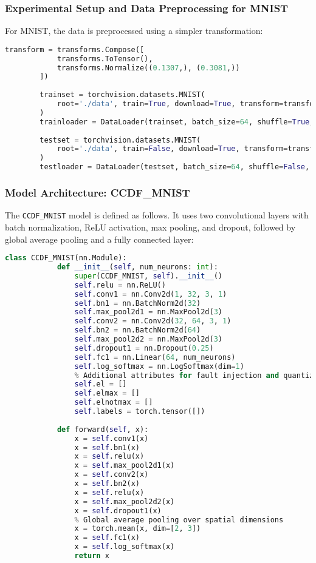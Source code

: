         \subsubsection{Experimental Setup and Data Preprocessing for MNIST}
        For MNIST, the data is preprocessed using a simpler transformation:
        \begin{lstlisting}[caption={Data Loading and Preprocessing for MNIST}, language=Python]
        transform = transforms.Compose([
            transforms.ToTensor(),
            transforms.Normalize((0.1307,), (0.3081,))
        ])
        
        trainset = torchvision.datasets.MNIST(
            root='./data', train=True, download=True, transform=transform
        )
        trainloader = DataLoader(trainset, batch_size=64, shuffle=True, num_workers=2)
        
        testset = torchvision.datasets.MNIST(
            root='./data', train=False, download=True, transform=transform
        )
        testloader = DataLoader(testset, batch_size=64, shuffle=False, num_workers=2)
        \end{lstlisting}
    
        \subsubsection{Model Architecture: CCDF\_MNIST}
        The \texttt{CCDF\_MNIST} model is defined as follows. It uses two convolutional layers with batch normalization, ReLU activation, max pooling, and dropout, followed by global average pooling and a fully connected layer:
        \begin{lstlisting}[caption={CCDF\_MNIST Model Definition}, language=Python]
        class CCDF_MNIST(nn.Module):
            def __init__(self, num_neurons: int):
                super(CCDF_MNIST, self).__init__()
                self.relu = nn.ReLU()
                self.conv1 = nn.Conv2d(1, 32, 3, 1)
                self.bn1 = nn.BatchNorm2d(32)
                self.max_pool2d1 = nn.MaxPool2d(3)
                self.conv2 = nn.Conv2d(32, 64, 3, 1)
                self.bn2 = nn.BatchNorm2d(64)
                self.max_pool2d2 = nn.MaxPool2d(3)
                self.dropout1 = nn.Dropout(0.25)
                self.fc1 = nn.Linear(64, num_neurons)
                self.log_softmax = nn.LogSoftmax(dim=1)
                % Additional attributes for fault injection and quantization analysis
                self.el = []
                self.elmax = []
                self.elnotmax = []
                self.labels = torch.tensor([])
        
            def forward(self, x):
                x = self.conv1(x)
                x = self.bn1(x)
                x = self.relu(x)
                x = self.max_pool2d1(x)
                x = self.conv2(x)
                x = self.bn2(x)
                x = self.relu(x)
                x = self.max_pool2d2(x)
                x = self.dropout1(x)
                % Global average pooling over spatial dimensions
                x = torch.mean(x, dim=[2, 3])
                x = self.fc1(x)
                x = self.log_softmax(x)
                return x
        \end{lstlisting}
    
